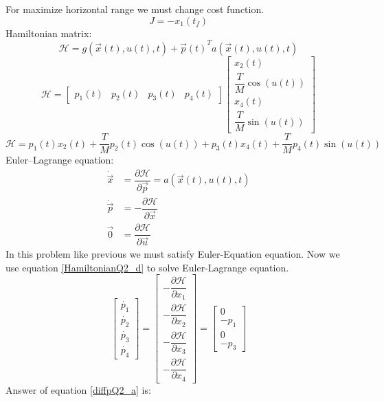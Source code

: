 For maximize horizontal range we must change cost function.
$$J = -x_1(t_f)$$
Hamiltonian matrix:
$$\mathcal{H} =  g(\vec x(t), u(t), t) + {\vec{p}(t)}^Ta(\vec x(t), u(t), t)$$
$$\mathcal{H} = \begin{bmatrix} 
	p_1(t) & p_2(t) & p_3(t) & p_4(t)
\end{bmatrix} \begin{bmatrix}
	x_2(t)\\
	\dfrac{T}{M} \cos(u(t))\\
	x_4(t)\\
	\dfrac{T}{M} \sin(u(t))
\end{bmatrix}$$
\begin{equation} \label{HamiltonianQ2_d}
	\mathcal{H} = p_1(t)x_2(t) + \dfrac{T}{M}p_2(t)\cos(u(t)) +p_3(t)x_4(t) +\dfrac{T}{M}p_4(t)\sin(u(t))
\end{equation}
Euler–Lagrange equation:
\begin{align}
	\dot{\vec{x}} &= \dfrac{\partial \mathcal{H} }{\partial \vec{p}} = a(\vec x(t), u(t), t)\\
	\dot{\vec{p}} &= -\dfrac{\partial \mathcal{H} }{\partial \vec{x}} \\
	{\vec{0}} &= \dfrac{\partial \mathcal{H} }{\partial \vec{u}}
\end{align}
In this problem like previous we must satisfy Euler-Equation equation.
Now  we use equation \ref{HamiltonianQ2_d} to solve Euler-Lagrange equation.
\begin{equation}\label{diffpQ2_d}
	\begin{bmatrix}
		\dot{p_1}\\
		\dot{p_2}\\
		\dot{p_3}\\
		\dot{p_4}
	\end{bmatrix} = \begin{bmatrix}
		-\dfrac{\partial \mathcal{H}}{\partial x_1} \\[10 pt]
		-\dfrac{\partial \mathcal{H}}{\partial x_2} \\[10 pt]
		-\dfrac{\partial \mathcal{H}}{\partial x_3} \\[10 pt]
		-\dfrac{\partial \mathcal{H}}{\partial x_4} 
	\end{bmatrix} = \begin{bmatrix}
		0 \\
		-p_1\\
		0\\
		-p_3
	\end{bmatrix}
\end{equation} 
Answer of equation \ref{diffpQ2_a} is:
